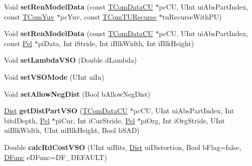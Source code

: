 \begin{DoxyCompactItemize}
Void {\bfseries set\+Ren\+Model\+Data} (const \hyperlink{class_t_com_data_c_u}{T\+Com\+Data\+CU} $\ast$pc\+CU, U\+Int ui\+Abs\+Part\+Index, const \hyperlink{class_t_com_yuv}{T\+Com\+Yuv} $\ast$pc\+Yuv, const \hyperlink{class_t_com_t_u_recurse}{T\+Com\+T\+U\+Recurse} $\ast$tu\+Recurse\+With\+PU)
\item 
\mbox{\label{class_t_com_rd_cost_a58bb6398b5b93ea3aa5668b0d4952c6c}} 
Void {\bfseries set\+Ren\+Model\+Data} (const \hyperlink{class_t_com_data_c_u}{T\+Com\+Data\+CU} $\ast$pc\+CU, U\+Int ui\+Abs\+Part\+Index, const \hyperlink{_type_def_8h_af92141699657699b4b547be0c8517541}{Pel} $\ast$pi\+Data, Int i\+Stride, Int i\+Blk\+Width, Int i\+Blk\+Height)
\item 
\mbox{\label{class_t_com_rd_cost_a194f2d90ee696e88907224a3436191ac}} 
Void {\bfseries set\+Lambda\+V\+SO} (Double d\+Lambda)
\item 
\mbox{\label{class_t_com_rd_cost_af754a964ad6b28c7495dc211ca6b5b4e}} 
Void {\bfseries set\+V\+S\+O\+Mode} (U\+Int ui\+In)
\item 
\mbox{\label{class_t_com_rd_cost_af2b70e9f32cf3700fb1bf08cd9deb064}} 
Void {\bfseries set\+Allow\+Neg\+Dist} (Bool b\+Allow\+Neg\+Dist)
\item 
\mbox{\label{class_t_com_rd_cost_a252ef747f449a0ce9d95f4393f771118}} 
\hyperlink{_type_def_8h_a507835e5fb717ea5af4e8b075c8cbede}{Dist} {\bfseries get\+Dist\+Part\+V\+SO} (\hyperlink{class_t_com_data_c_u}{T\+Com\+Data\+CU} $\ast$pc\+CU, U\+Int ui\+Abs\+Part\+Index, Int bitd\+Depth, \hyperlink{_type_def_8h_af92141699657699b4b547be0c8517541}{Pel} $\ast$pi\+Cur, Int i\+Cur\+Stride, \hyperlink{_type_def_8h_af92141699657699b4b547be0c8517541}{Pel} $\ast$pi\+Org, Int i\+Org\+Stride, U\+Int ui\+Blk\+Width, U\+Int ui\+Blk\+Height, Bool b\+S\+AD)
\item 
\mbox{\label{class_t_com_rd_cost_ae0e5eac1046d8324c878a67dbf171e5a}} 
Double {\bfseries calc\+Rd\+Cost\+V\+SO} (U\+Int ui\+Bits, \hyperlink{_type_def_8h_a507835e5fb717ea5af4e8b075c8cbede}{Dist} ui\+Distortion, Bool b\+Flag=false, \hyperlink{_type_def_8h_ac19dbe1a542fc0c0bc8a94fcc55907c8}{D\+Func} e\+D\+Func=D\+F\+\_\+\+D\+E\+F\+A\+U\+LT)
\item 

\end{DoxyCompactItemize}
